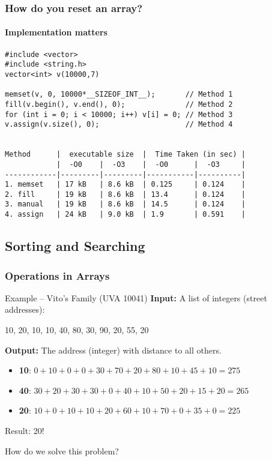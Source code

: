 \begin{frame}[fragile]
  \frametitle{How do you reset an array?}
  \framesubtitle{Implementation matters}
{\small
\begin{verbatim}
#include <vector>
#include <string.h>
vector<int> v(10000,7)

memset(v, 0, 10000*__SIZEOF_INT__);       // Method 1
fill(v.begin(), v.end(), 0);              // Method 2
for (int i = 0; i < 10000; i++) v[i] = 0; // Method 3
v.assign(v.size(), 0);                    // Method 4


Method      |  executable size  |  Time Taken (in sec) |
            |  -O0    |  -O3    |  -O0      |  -O3     |
------------|---------|---------|-----------|----------|
1. memset   | 17 kB   | 8.6 kB  | 0.125     | 0.124    |
2. fill     | 19 kB   | 8.6 kB  | 13.4      | 0.124    |
3. manual   | 19 kB   | 8.6 kB  | 14.5      | 0.124    |
4. assign   | 24 kB   | 9.0 kB  | 1.9       | 0.591    |
\end{verbatim}
}
\end{frame}

\subsection{Sorting and Searching}

\begin{frame}
  \frametitle{Operations in Arrays}

  \begin{block}{Example -- Vito's Family (UVA 10041)}
    {\bf Input:} A list of integers (street addresses):\\

    \smallskip

    10, 20, 10, 10, 40, 80, 30, 90, 20, 55, 20

    \bigskip

    {\bf Output:} The address (integer) with  distance to all others.
    \begin{itemize}
      \item {\bf 10}: $0+10+0+0+30+70+20+80+10+45+10 = 275$
      \item {\bf 40}: $30+20+30+30+0+40+10+50+20+15+20 = 265$
      \item {\bf 20}: $10+0+10+10+20+60+10+70+0+35+0 = 225$
    \end{itemize}

    \bigskip

    Result: 20!

  \end{block}

  \bigskip

  How do we solve this problem?

\end{frame}

